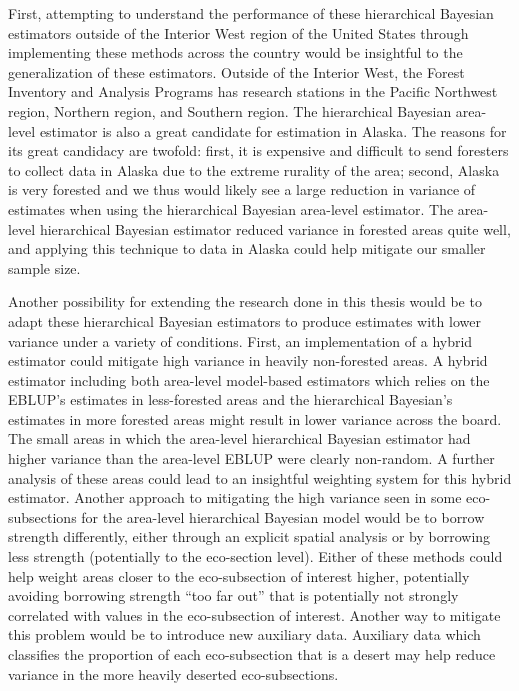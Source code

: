 \documentclass[12pt,twoside]{reedthesis}
\begin{document}
First, attempting to understand the performance of these hierarchical Bayesian estimators outside of the Interior West region of the United States through implementing these methods across the country would be insightful to the generalization of these estimators. Outside of the Interior West, the Forest Inventory and Analysis Programs has research stations in the Pacific Northwest region, Northern region, and Southern region. The hierarchical Bayesian area-level estimator is also a great candidate for estimation in Alaska. The reasons for its great candidacy are twofold: first, it is expensive and difficult to send foresters to collect data in Alaska due to the extreme rurality of the area; second, Alaska is very forested and we thus would likely see a large reduction in variance of estimates when using the hierarchical Bayesian area-level estimator. The area-level hierarchical Bayesian estimator reduced variance in forested areas quite well, and applying this technique to data in Alaska could help mitigate our smaller sample size.

Another possibility for extending the research done in this thesis would be to adapt these hierarchical Bayesian estimators to produce estimates with lower variance under a variety of conditions. First, an implementation of a hybrid estimator could mitigate high variance in heavily non-forested areas. A hybrid estimator including both area-level model-based estimators which relies on the EBLUP's estimates in less-forested areas and the hierarchical Bayesian's estimates in more forested areas might result in lower variance across the board. The small areas in which the area-level hierarchical Bayesian estimator had higher variance than the area-level EBLUP were clearly non-random. A further analysis of these areas could lead to an insightful weighting system for this hybrid estimator. Another approach to mitigating the high variance seen in some eco-subsections for the area-level hierarchical Bayesian model would be to borrow strength differently, either through an explicit spatial analysis or by borrowing less strength (potentially to the eco-section level). Either of these methods could help weight areas closer to the eco-subsection of interest higher, potentially avoiding borrowing strength ``too far out'' that is potentially not strongly correlated with values in the eco-subsection of interest. Another way to mitigate this problem would be to introduce new auxiliary data. Auxiliary data which classifies the proportion of each eco-subsection that is a desert may help reduce variance in the more heavily deserted eco-subsections.
\end{document}

